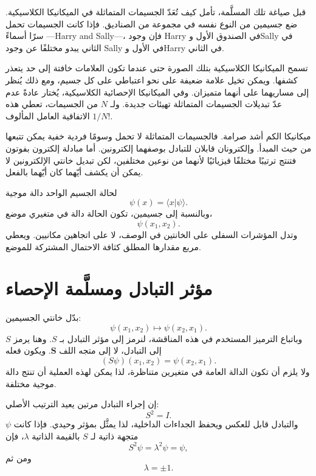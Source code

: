 قبل صياغة تلك المسلَّمة، تأمل كيف تُعَدّ الجسيمات المتماثلة في الميكانيكا الكلاسيكية. ضع جسيمين من النوع نفسه في مجموعة من الصناديق. فإذا كانت الجسيمات تحمل سرًا أسماءً ---Harry and Sally---، فإن وجود Harry في الصندوق الأول وSally في الثاني يبدو مختلفًا عن وجود Sally في الأول وHarry في الثاني.

تسمح الميكانيكا الكلاسيكية بتلك الصورة حتى عندما تكون العلامات خافتة إلى حد يتعذر كشفها. ويمكن تخيل علامة ضعيفة على نحو اعتباطي على كل جسيم، ومع ذلك يُنظر إلى مساريهما على أنهما متميزان. وفي الميكانيكا الإحصائية الكلاسيكية، يُختار عادةً عدم عدّ تبديلات الجسيمات المتماثلة تهيئات جديدة. ولـ \(N\) من الجسيمات، تعطي هذه الاتفاقية العامل المألوف \(1/N!\).

ميكانيكا الكم أشد صرامة. فالجسيمات المتماثلة لا تحمل وسومًا فردية خفية يمكن تتبعها من حيث المبدأ. وإلكترونان قابلان للتبادل بوصفهما إلكترونين. أما مبادلة إلكترون بفوتون فتنتج ترتيبًا مختلفًا فيزيائيًا لأنهما من نوعين مختلفين، لكن تبديل خانتي الإلكترونين لا يمكن أن يكشف أيّهما كان أيّهما بالفعل.

لحالة الجسيم الواحد دالة موجية
\[
\psi(x)=\langle x\vert\psi\rangle.
\]
وبالنسبة إلى جسيمين، تكون الحالة دالة في متغيري موضع،
\begin{equation}
\psi(x_{1},x_{2}).
\end{equation}
وتدل المؤشرات السفلى على الخانتين في الوصف، لا على اتجاهين مكانيين. ويعطي مربع مقدارها المطلق كثافة الاحتمال المشتركة للموضع.

\section{مؤثر التبادل ومسلَّمة الإحصاء}

بدّل خانتي الجسيمين:
\begin{equation}
\psi(x_{1},x_{2})\longmapsto\psi(x_{2},x_{1}).
\end{equation}
وباتباع الترميز المستخدم في هذه المناقشة، لنرمز إلى مؤثر التبادل بـ \(S\). وهنا يرمز \(S\) إلى التبادل، لا إلى متجه اللف \(\mathbf S\). ويكون فعله
\begin{equation}
(S\psi)(x_{1},x_{2})=\psi(x_{2},x_{1}).
\end{equation}
ولا يلزم أن تكون الدالة العامة في متغيرين متناظرة، لذا يمكن لهذه العملية أن تنتج دالة موجية مختلفة.

إن إجراء التبادل مرتين يعيد الترتيب الأصلي:
\begin{equation}
S^{2}=I.
\end{equation}
والتبادل قابل للعكس ويحفظ الجداءات الداخلية، لذا يمثَّل بمؤثر وحيدي. فإذا كانت \(\psi\) متجهة ذاتية لـ \(S\) بالقيمة الذاتية \(\lambda\)، فإن
\[
S^{2}\psi=\lambda^{2}\psi=\psi,
\]
ومن ثم
\begin{equation}
\lambda=\pm1.
\end{equation}

